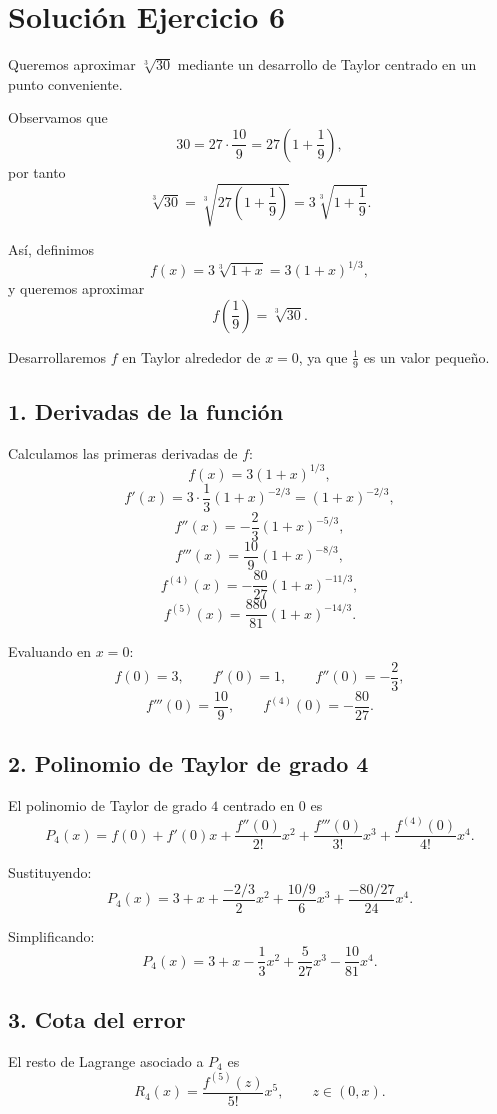 \documentclass[12pt]{article}
\begin{document}
\section*{Solución Ejercicio 6}

Queremos aproximar \(\sqrt[3]{30}\) mediante un desarrollo de Taylor centrado en un punto conveniente.

Observamos que
\[
30 = 27\cdot \frac{10}{9} = 27\left(1+\frac{1}{9}\right),
\]
por tanto
\[
\sqrt[3]{30}
= \sqrt[3]{27\left(1+\frac{1}{9}\right)}
= 3\sqrt[3]{1+\frac{1}{9}}.
\]

Así, definimos
\[
f(x)=3\sqrt[3]{1+x}=3(1+x)^{1/3},
\]
y queremos aproximar
\[
f\left(\frac{1}{9}\right)=\sqrt[3]{30}.
\]

Desarrollaremos \(f\) en Taylor alrededor de \(x=0\), ya que \(\frac{1}{9}\) es un valor pequeño.

\subsection*{1. Derivadas de la función}

Calculamos las primeras derivadas de \(f\):
\[
f(x)=3(1+x)^{1/3},
\]
\[
f'(x)=3\cdot \frac{1}{3}(1+x)^{-2/3}=(1+x)^{-2/3},
\]
\[
f''(x)=-\frac{2}{3}(1+x)^{-5/3},
\]
\[
f'''(x)=\frac{10}{9}(1+x)^{-8/3},
\]
\[
f^{(4)}(x)=-\frac{80}{27}(1+x)^{-11/3},
\]
\[
f^{(5)}(x)=\frac{880}{81}(1+x)^{-14/3}.
\]

Evaluando en \(x=0\):
\[
f(0)=3,\qquad f'(0)=1,\qquad f''(0)=-\frac{2}{3},
\]
\[
f'''(0)=\frac{10}{9},\qquad f^{(4)}(0)=-\frac{80}{27}.
\]

\subsection*{2. Polinomio de Taylor de grado 4}

El polinomio de Taylor de grado \(4\) centrado en \(0\) es
\[
P_4(x)=f(0)+f'(0)x+\frac{f''(0)}{2!}x^2+\frac{f'''(0)}{3!}x^3+\frac{f^{(4)}(0)}{4!}x^4.
\]

Sustituyendo:
\[
P_4(x)
=3+x+\frac{-2/3}{2}x^2+\frac{10/9}{6}x^3+\frac{-80/27}{24}x^4.
\]

Simplificando:
\[
P_4(x)=3+x-\frac{1}{3}x^2+\frac{5}{27}x^3-\frac{10}{81}x^4.
\]

\subsection*{3. Cota del error}

El resto de Lagrange asociado a \(P_4\) es
\[
R_4(x)=\frac{f^{(5)}(z)}{5!}x^5,
\qquad z\in(0,x).
\]
\end{document}
